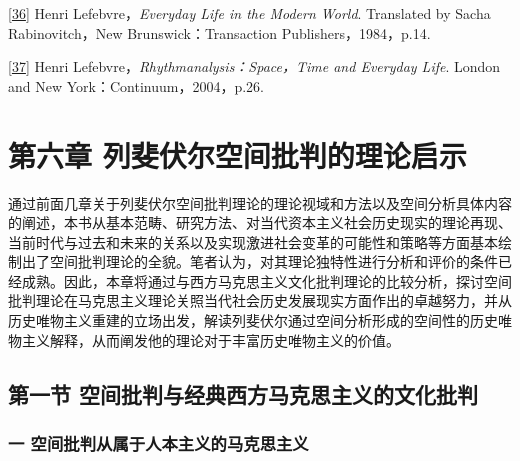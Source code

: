 \documentclass[UTF8, fontset = sourcesans, a4paper, oneside, zihao =
-4, scheme=chinese, no-math, space=true]{ctexbook}
\begin{document}
\protect\hypertarget{part0009_split_004.htmlux5cux23m36}{}{}\protect\hyperlink{part0009_split_004.htmlux5cux23w36}{{[}36{]}}
Henri Lefebvre，\emph{Everyday Life in the Modern World}. Translated by
Sacha Rabinovitch，New Brunswick：Transaction Publishers，1984，p.14.

\protect\hypertarget{part0009_split_004.htmlux5cux23m37}{}{}\protect\hyperlink{part0009_split_004.htmlux5cux23w37}{{[}37{]}}
Henri Lefebvre，\emph{Rhythmanalysis：Space，Time and Everyday Life}.
London and New York：Continuum，2004，p.26.

\protect\hypertarget{part0010_split_000.html}{}{}

\hypertarget{part0010_split_000.htmlux5cux23a010}{\chapter{第六章
列斐伏尔空间批判的理论启示}\label{part0010_split_000.htmlux5cux23a010}}

通过前面几章关于列斐伏尔空间批判理论的理论视域和方法以及空间分析具体内容的阐述，本书从基本范畴、研究方法、对当代资本主义社会历史现实的理论再现、当前时代与过去和未来的关系以及实现激进社会变革的可能性和策略等方面基本绘制出了空间批判理论的全貌。笔者认为，对其理论独特性进行分析和评价的条件已经成熟。因此，本章将通过与西方马克思主义文化批判理论的比较分析，探讨空间批判理论在马克思主义理论关照当代社会历史发展现实方面作出的卓越努力，并从历史唯物主义重建的立场出发，解读列斐伏尔通过空间分析形成的空间性的历史唯物主义解释，从而阐发他的理论对于丰富历史唯物主义的价值。

\protect\hypertarget{part0010_split_001.html}{}{}

\hypertarget{part0010_split_001.htmlux5cux23b018}{\section{第一节
空间批判与经典西方马克思主义的文化批判}\label{part0010_split_001.htmlux5cux23b018}}

\subsection{一
空间批判从属于人本主义的马克思主义}\label{part0010_split_001.htmlux5cux23c056}
\end{document}
